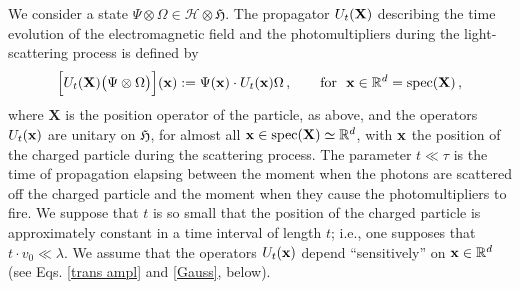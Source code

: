 \documentclass[12pt]{article}
\begin{document}
We consider a state 
$\Psi \otimes \Omega \in \mathcal{H}\otimes \mathfrak{H}$. The propagator $U_{t}({\bf{X}})$ describing the time evolution of the electromagnetic field and the photomultipliers during the light-scattering process is defined by
\begin{equation}\label{prop}
\Big[U_{t}({\bf{X}}) \big( \Psi \otimes \Omega \big)\Big]({\bf{x}}):= \Psi({\bf{x}})\cdot U_{t}({\bf{x}})\Omega\,, \qquad \text{for  }\,\, {\bf{x}}\in \mathbb{R}^{d}= \text{spec}({\bf{X}})\,,
\end{equation}
where $\mathbf{X}$ is the position operator of the particle, as above, and the operators $U_{t}({\bf{x}})$ 
are unitary on $\mathfrak{H}$, for almost all ${\bf{x}}\in \text{spec}(\mathbf{X}) \simeq \mathbb{R}^{d}$, 
with ${\bf{x}}$ the position of the charged particle during the scattering process. 
The parameter $t\ll \tau$ is the time of propagation elapsing between the moment when the photons are scattered 
off the charged particle and the moment when they cause the photomultipliers to fire. We suppose that $t$ is so small 
that the position of the charged particle is approximately constant in a time interval of length $t$; i.e., one supposes that 
$t\cdot v_0 \ll \lambda$. We assume that the operators $U_{t}({\bf{x}})$ depend ``sensitively'' on ${\bf{x}} \in \mathbb{R}^{d}$ (see Eqs. \eqref{trans ampl} and \eqref{Gauss}, below).
\end{document}
